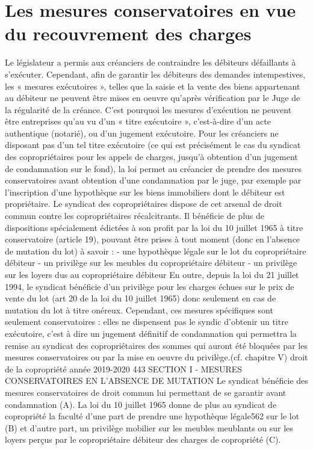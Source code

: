 \chapter{Les mesures conservatoires en vue du recouvrement des charges}

Le législateur a permis aux créanciers de contraindre les débiteurs défaillants à s'exécuter.
Cependant, afin de garantir les débiteurs des demandes intempestives, les « mesures exécutoires », telles que la saisie et la vente des biens appartenant au débiteur ne peuvent être mises en oeuvre qu’après vérification par le Juge de la régularité de la créance. C’est pourquoi les mesures d’exécution ne peuvent être entreprises qu’au vu d’un « titre exécutoire », c’est-à-dire d’un acte authentique (notarié), ou d’un jugement exécutoire.
Pour les créanciers ne disposant pas d’un tel titre exécutoire (ce qui est précisément le cas du syndicat des copropriétaires pour les appels de charges, jusqu’à obtention d’un jugement de condamnation sur le fond), la loi permet au créancier de prendre des mesures conservatoires avant obtention d'une condamnation par le juge, par exemple par l’inscription d’une hypothèque sur les biens immobiliers dont le débiteur est propriétaire. Le syndicat des copropriétaires dispose de cet arsenal de droit commun contre les copropriétaires récalcitrants.
Il bénéficie de plus de dispositions spécialement édictées à son profit par la loi du 10 juillet 1965 à titre conservatoire (article 19), pouvant être prises à tout moment (donc en l’absence de mutation du lot) à savoir :
- une hypothèque légale sur le lot du copropriétaire débiteur
- un privilège sur les meubles du copropriétaire débiteur
- un privilège sur les loyers dus au copropriétaire débiteur
En outre, depuis la loi du 21 juillet 1994, le syndicat bénéficie d'un privilège pour les charges échues sur le prix de vente du lot (art 20 de la loi du 10 juillet 1965) donc seulement en cas de mutation du lot à titre onéreux.
Cependant, ces mesures spécifiques sont seulement conservatoires : elles ne dispensent pas le syndic d'obtenir un titre exécutoire, c'est à dire un jugement définitif de condamnation qui permettra la remise au syndicat des copropriétaires des sommes qui auront été bloquées par les mesures conservatoires ou par la mise en oeuvre du privilège.(cf. chapitre V)
droit de la copropriété année 2019-2020
443
SECTION I - MESURES CONSERVATOIRES EN L'ABSENCE DE MUTATION
Le syndicat bénéficie des mesures conservatoires de droit commun lui permettant de se garantir avant condamnation (A).
La loi du 10 juillet 1965 donne de plus au syndicat de copropriété la faculté d'une part de prendre une hypothèque légale562 sur le lot (B) et d'autre part, un privilège mobilier sur les meubles meublants ou sur les loyers perçus par le copropriétaire débiteur des charges de copropriété (C).

